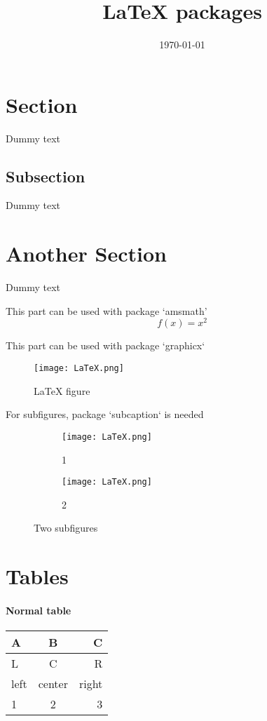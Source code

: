 \documentclass{article}
\title{LaTeX packages}
\date{\today}
\begin{document}
\maketitle
\newpage
\doublespacing
\tableofcontents
\singlespacing
\newpage

\section{Section}
Dummy text
\subsection{Subsection}
Dummy text
\section{Another Section}
Dummy text

This part can be used with package `amsmath'
\begin{equation*}
  f(x) = x^2
\end{equation*}

This part can be used with package `graphicx`
\begin{figure}[h!]
  \texttt{[image: LaTeX.png]}
  \caption{LaTeX figure}
  \label{fig:LaTeX}
\end{figure}

For subfigures, package `subcaption` is needed
\begin{figure}[h!]
  \centering
  \begin{subfigure}[b]{0.4\linewidth}
    \texttt{[image: LaTeX.png]}
    \caption{1}
  \end{subfigure}
  \begin{subfigure}[b]{0.4\linewidth}
    \texttt{[image: LaTeX.png]}
    \caption{2}
  \end{subfigure}
  \caption{Two subfigures}
  \label{fig:LaTeX2}
\end{figure}

\newpage
\section{Tables}
\paragraph{Normal table}
\begin{tabular}{| l | c | r |}
\hline
A & B & C\\
\hline
L & C & R\\
left & center & right\\
\hline
1 & 2 & 3\\
\hline
\end{tabular}
\end{document}

